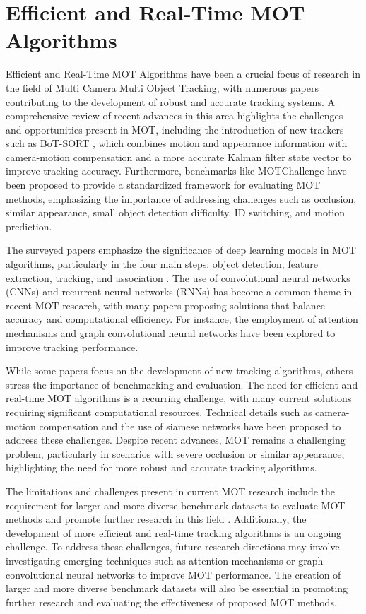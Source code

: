 \documentclass[conference]{IEEEtran}
\begin{document}
\section{Efficient and Real-Time MOT Algorithms}
Efficient and Real-Time MOT Algorithms have been a crucial focus of research in the field of Multi Camera Multi Object Tracking, with numerous papers contributing to the development of robust and accurate tracking systems. A comprehensive review of recent advances in this area highlights the challenges and opportunities present in MOT, including the introduction of new trackers such as BoT-SORT \cite{BoT-SORT paper}, which combines motion and appearance information with camera-motion compensation and a more accurate Kalman filter state vector to improve tracking accuracy. Furthermore, benchmarks like MOTChallenge \cite{MOTChallenge paper} have been proposed to provide a standardized framework for evaluating MOT methods, emphasizing the importance of addressing challenges such as occlusion, similar appearance, small object detection difficulty, ID switching, and motion prediction.

The surveyed papers emphasize the significance of deep learning models in MOT algorithms, particularly in the four main steps: object detection, feature extraction, tracking, and association \cite{Deep Learning for MOT}. The use of convolutional neural networks (CNNs) and recurrent neural networks (RNNs) has become a common theme in recent MOT research, with many papers proposing solutions that balance accuracy and computational efficiency. For instance, the employment of attention mechanisms \cite{Attention Mechanisms for MOT} and graph convolutional neural networks \cite{Graph Convolutional Neural Networks for MOT} have been explored to improve tracking performance.

While some papers focus on the development of new tracking algorithms, others stress the importance of benchmarking and evaluation. The need for efficient and real-time MOT algorithms is a recurring challenge, with many current solutions requiring significant computational resources. Technical details such as camera-motion compensation \cite{Camera-Motion Compensation} and the use of siamese networks \cite{Siamese Networks for MOT} have been proposed to address these challenges. Despite recent advances, MOT remains a challenging problem, particularly in scenarios with severe occlusion or similar appearance, highlighting the need for more robust and accurate tracking algorithms.

The limitations and challenges present in current MOT research include the requirement for larger and more diverse benchmark datasets to evaluate MOT methods and promote further research in this field \cite{Need for Larger Datasets}. Additionally, the development of more efficient and real-time tracking algorithms is an ongoing challenge. To address these challenges, future research directions may involve investigating emerging techniques such as attention mechanisms or graph convolutional neural networks to improve MOT performance. The creation of larger and more diverse benchmark datasets will also be essential in promoting further research and evaluating the effectiveness of proposed MOT methods.
\end{document}
